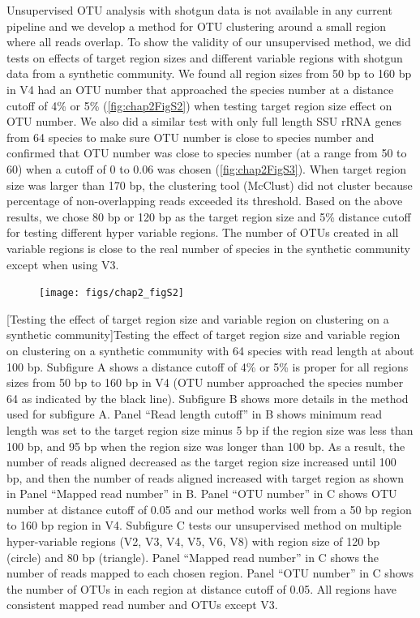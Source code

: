 \documentclass[]{msu-thesis}
\begin{document}
Unsupervised OTU analysis with shotgun data is not available in any current pipeline and we develop a method for OTU clustering around a small region where all reads overlap. To show the validity of our unsupervised method, we did tests on effects of target region sizes and different variable regions with shotgun data from a synthetic community. We found all region sizes from 50 bp to 160 bp in V4 had an OTU number that approached the species number at a distance cutoff of 4\% or 5\% (\cref{fig:chap2FigS2}) when testing target region size effect on OTU number. We also did a similar test with only full length SSU rRNA genes from 64 species to make sure OTU number is close to species number and confirmed that OTU number was close to species number (at a range from 50 to 60) when a cutoff of 0 to 0.06 was chosen (\cref{fig:chap2FigS3}). When target region size was larger than 170 bp, the clustering tool (McClust) \cite{cole_ribosomal_2014} did not cluster because percentage of non-overlapping reads exceeded its threshold. Based on the above results, we chose 80 bp or 120 bp as the target region size and 5\% distance cutoff for testing different hyper variable regions. The number of OTUs created in all variable regions is close to the real number of species in the synthetic community except when using V3.


\begin{figure}[tbph!]
  \centering
  \texttt{[image: figs/chap2\_figS2]}
\end{figure}
\clearpage
\SingleSpacing
{}[Testing the effect of target region size and variable region on clustering on a synthetic community]{Testing the effect of target region size and variable region on clustering on a synthetic community with 64 species with read length at about 100 bp. Subfigure A shows a distance cutoff of 4\% or 5\% is proper for all regions sizes from 50 bp to 160 bp in V4 (OTU number approached the species number 64 as indicated by the black line).  Subfigure B shows more details in the method used for subfigure A. Panel ``Read length cutoff'' in B shows minimum read length was set to the target region size minus 5 bp if the region size was less than 100 bp, and 95 bp when the region size was longer than 100 bp. As a result, the number of reads aligned decreased as the target region size increased until 100 bp, and then the number of reads aligned increased with target region as shown in Panel ``Mapped read number'' in B. Panel ``OTU number'' in C shows OTU number at distance cutoff of 0.05 and our method works well from a 50 bp region to 160 bp region in V4. Subfigure C tests our unsupervised method on multiple hyper-variable regions (V2, V3, V4, V5, V6, V8) with region size of 120 bp (circle) and 80 bp (triangle). Panel ``Mapped read number'' in C shows the number of reads mapped to each chosen region. Panel ``OTU number'' in C shows the number of OTUs in each region at distance cutoff of 0.05. All regions have consistent mapped read number and OTUs except V3.}
\label{fig:chap2FigS2}
\DoubleSpacing
\bigskip
\end{document}

